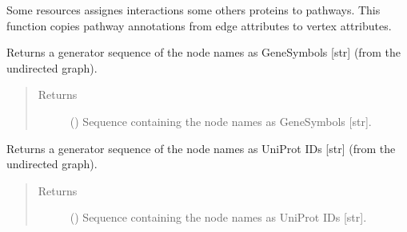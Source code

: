 \documentclass[letterpaper,10pt,english]{sphinxmanual}
\begin{document}
\begin{fulllineitems}
\begin{fulllineitems}
\end{fulllineitems}


\begin{fulllineitems}
\label{\detokenize{main:pypath.main.PyPath.vertex_pathways}}
Some resources assignes interactions some others proteins to
pathways. This function copies pathway annotations from edge
attributes to vertex attributes.

\end{fulllineitems}


\begin{fulllineitems}
\label{\detokenize{main:pypath.main.PyPath.vs}}
\end{fulllineitems}


\begin{fulllineitems}
\label{\detokenize{main:pypath.main.PyPath.vsgs}}
Returns a generator sequence of the node names as GeneSymbols
{[}str{]} (from the undirected graph).
\begin{quote}\begin{description}
\item[{Returns}] \leavevmode
() \textendash{} Sequence containing the node names as
GeneSymbols {[}str{]}.

\end{description}\end{quote}

\end{fulllineitems}


\begin{fulllineitems}
\label{\detokenize{main:pypath.main.PyPath.vsup}}
Returns a generator sequence of the node names as UniProt IDs
{[}str{]} (from the undirected graph).
\begin{quote}\begin{description}
\item[{Returns}] \leavevmode
() \textendash{} Sequence containing the node names as
UniProt IDs {[}str{]}.


\end{description}
\end{quote}
\end{fulllineitems}
\end{fulllineitems}
\end{document}
